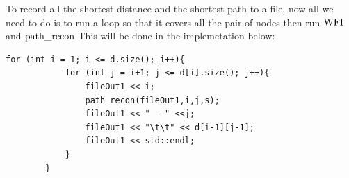 \documentclass[a4paper,12pt]{article}%
\begin{document}
To record all the shortest distance and the shortest path to a file, now all we need to do is to run a loop so that it covers all the pair of nodes then run $\lstinline{WFI}$ and $\lstinline{path_recon}$ This will be done in the implemetation below:
\begin{lstlisting}
for (int i = 1; i <= d.size(); i++){
            for (int j = i+1; j <= d[i].size(); j++){
                fileOut1 << i;
                path_recon(fileOut1,i,j,s);
                fileOut1 << " - " <<j; 
                fileOut1 << "\t\t" << d[i-1][j-1];
                fileOut1 << std::endl;
            }           
        }
\end{lstlisting}




\end{document}
